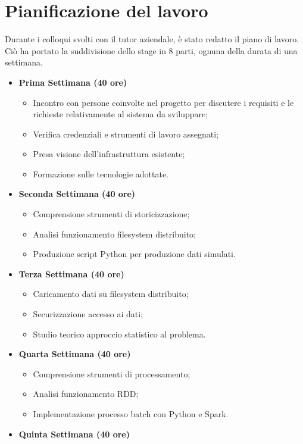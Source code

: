 \section{Pianificazione del lavoro}
Durante i colloqui svolti con il tutor aziendale, è stato redatto il piano di lavoro. Ciò ha portato la suddivisione dello stage in 8 parti, ognuna della durata di una settimana.
    \begin{itemize}
	\item[] \textbf{Prima Settimana (40 ore)}
	\begin{itemize}
		\item Incontro con persone coinvolte nel progetto per discutere i requisiti e le richieste
		relativamente al sistema da sviluppare;
		\item Verifica credenziali e strumenti di lavoro assegnati;
		\item Presa visione dell’infrastruttura esistente;
		\item Formazione sulle tecnologie adottate.
	\end{itemize}
	\item[] \textbf{Seconda Settimana (40 ore)} 
	\begin{itemize}
		\item Comprensione strumenti di storicizzazione;
		\item Analisi funzionamento filesystem distribuito;
		\item Produzione script Python per produzione dati simulati.
	\end{itemize}
	\item[] \textbf{Terza Settimana (40 ore)} 
	\begin{itemize}
		\item Caricamento dati su filesystem distribuito;
		\item Securizzazione accesso ai dati;
		\item Studio teorico approccio statistico al problema.
	\end{itemize}
	\item[] \textbf{Quarta Settimana (40 ore)} 
	\begin{itemize}
		\item Comprensione strumenti di processamento;
		\item Analisi funzionamento RDD;
		\item Implementazione processo batch con Python e Spark.        
	\end{itemize}
	\item[] \textbf{Quinta Settimana (40 ore)} 
	\begin{itemize}

\end{itemize}
\end{itemize}
